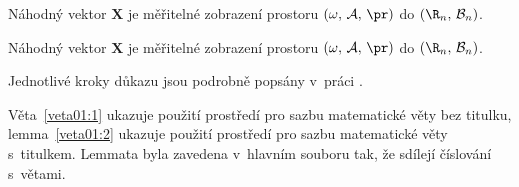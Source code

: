 \begin{veta}\label{veta01:1}
  Náhodný vektor $\bm X$ je měřitelné zobrazení prostoru
  $(\omega,\,\mathcal{A},\,\pr)$ do $(\R_n,\,\mathcal{B}_n)$.
\end{veta}

\begin{lemma}
  Náhodný vektor $\bm X$ je měřitelné zobrazení prostoru
  $(\omega,\,\mathcal{A},\,\pr)$ do $(\R_n,\,\mathcal{B}_n)$.
\end{lemma}
\begin{dukaz}
  Jednotlivé kroky důkazu jsou podrobně popsány v~práci \citet[str.
    29]{Andel07}.
\end{dukaz}
Věta~\ref{veta01:1} ukazuje použití prostředí pro sazbu matematické
věty bez titulku, lemma~\ref{veta01:2} ukazuje použití prostředí pro
sazbu matematické věty s~titulkem. Lemmata byla zavedena v~hlavním
souboru tak, že sdílejí číslování s~větami.
